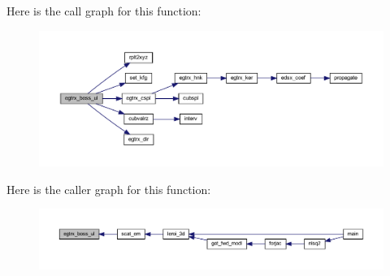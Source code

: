 Here is the call graph for this function\+:\nopagebreak
\begin{figure}[H]
\begin{center}
\leavevmode
\includegraphics[width=350pt]{Leroi_8f90_a1770320680e91059231180f0654cce66_cgraph}
\end{center}
\end{figure}
Here is the caller graph for this function\+:\nopagebreak
\begin{figure}[H]
\begin{center}
\leavevmode
\includegraphics[width=350pt]{Leroi_8f90_a1770320680e91059231180f0654cce66_icgraph}
\end{center}
\end{figure}
\mbox{\label{Leroi_8f90_a10fd9ada0ec15151a8112666c09a245d}} 
